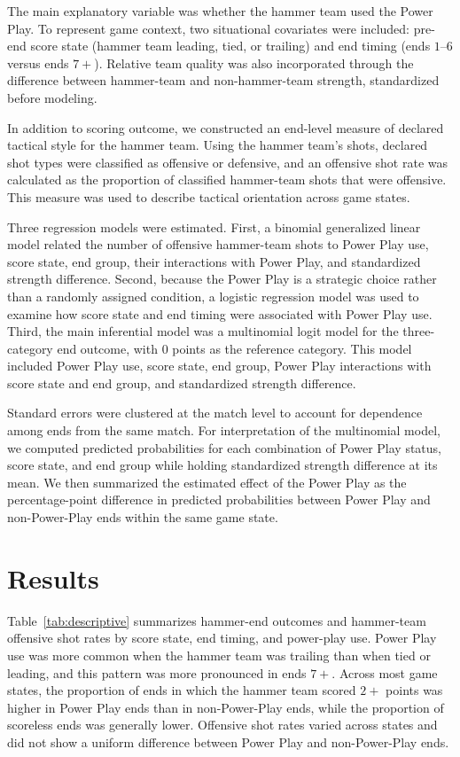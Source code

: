 \documentclass[titlepage, 12pt]{article}
\begin{document}
The main explanatory variable was whether the hammer team used the Power Play.
To represent game context, two situational covariates were included: pre-end
score state (hammer team leading, tied, or trailing) and end timing (ends
\(1\)--\(6\) versus ends \(7+\)). Relative team quality was also incorporated
through the difference between hammer-team and non-hammer-team strength,
standardized before modeling.

In addition to scoring outcome, we constructed an end-level measure of declared
tactical style for the hammer team. Using the hammer team's shots, declared
shot types were classified as offensive or defensive, and an offensive shot
rate was calculated as the proportion of classified hammer-team shots that were
offensive. This measure was used to describe tactical orientation across game
states.

Three regression models were estimated. First, a binomial generalized linear
model related the number of offensive hammer-team shots to Power Play use,
score state, end group, their interactions with Power Play, and standardized
strength difference. Second, because the Power Play is a strategic choice
rather than a randomly assigned condition, a logistic regression model was used
to examine how score state and end timing were associated with Power Play use.
Third, the main inferential model was a multinomial logit model for the
three-category end outcome, with 0 points as the reference category. This model
included Power Play use, score state, end group, Power Play interactions with
score state and end group, and standardized strength difference.

Standard errors were clustered at the match level to account for dependence
among ends from the same match. For interpretation of the multinomial model, we
computed predicted probabilities for each combination of Power Play status,
score state, and end group while holding standardized strength difference at
its mean. We then summarized the estimated effect of the Power Play as the
percentage-point difference in predicted probabilities between Power Play and
non-Power-Play ends within the same game state.

\section{Results}\label{sec:resu}

Table~\ref{tab:descriptive} summarizes hammer-end outcomes and hammer-team
offensive shot rates by score state, end timing, and power-play use. Power Play
use was more common when the hammer team was trailing than when tied or
leading, and this pattern was more pronounced in ends \(7+\). Across most game
states, the proportion of ends in which the hammer team scored \(2+\) points
was higher in Power Play ends than in non-Power-Play ends, while the proportion
of scoreless ends was generally lower. Offensive shot rates varied across
states and did not show a uniform difference between Power Play and
non-Power-Play ends.
\end{document}
